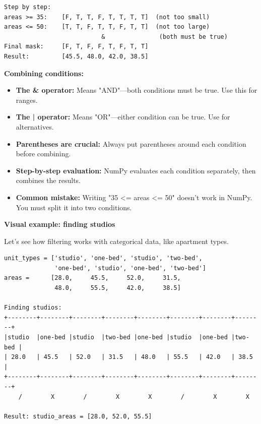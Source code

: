 \begin{tcolorbox}[
    title=How filtering works,
    colframe=purple,
    colback = white,
    arc=2mm,
    breakable
]
\begin{lstlisting}[basicstyle=\ttfamily\footnotesize,breaklines=true,columns=fullflexible,keepspaces=true,xleftmargin=0pt]
Step by step:
areas >= 35:    [F, T, T, F, T, T, T, T]  (not too small)
areas <= 50:    [T, T, F, T, T, F, T, T]  (not too large)
                           &               (both must be true)
Final mask:     [F, T, F, F, T, F, T, T]
Result:         [45.5, 48.0, 42.0, 38.5]
\end{lstlisting}

\textbf{Combining conditions:}
\begin{itemize}
\item \textbf{The \& operator:} Means "AND"---both conditions must be true. Use this for ranges.
\item \textbf{The | operator:} Means "OR"---either condition can be true. Use for alternatives.
\item \textbf{Parentheses are crucial:} Always put parentheses around each condition before combining.
\item \textbf{Step-by-step evaluation:} NumPy evaluates each condition separately, then combines the results.
\item \textbf{Common mistake:} Writing "35 <= areas <= 50" doesn't work in NumPy. You must split it into two conditions.
\end{itemize}
\vspace{2em}

\textbf{Visual example: finding studios}

Let's see how filtering works with categorical data, like apartment types.

\begin{lstlisting}[basicstyle=\ttfamily\footnotesize,breaklines=true,columns=fullflexible,keepspaces=true,xleftmargin=0pt]
unit_types = ['studio', 'one-bed', 'studio', 'two-bed', 
              'one-bed', 'studio', 'one-bed', 'two-bed']
areas =      [28.0,     45.5,     52.0,     31.5,
              48.0,     55.5,     42.0,     38.5]

Finding studios:
+--------+--------+--------+--------+--------+--------+--------+--------+
|studio  |one-bed |studio  |two-bed |one-bed |studio  |one-bed |two-bed |
| 28.0   | 45.5   | 52.0   | 31.5   | 48.0   | 55.5   | 42.0   | 38.5   |
+--------+--------+--------+--------+--------+--------+--------+--------+
    /        X        /        X        X        /        X        X
    
Result: studio_areas = [28.0, 52.0, 55.5]
\end{lstlisting}


\end{tcolorbox}
